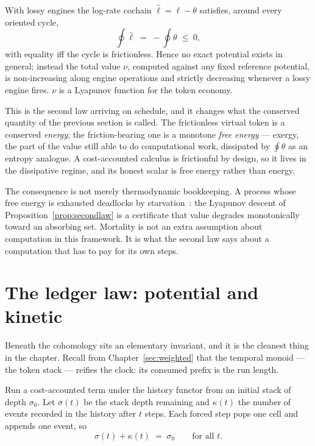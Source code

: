 \begin{proposition}
\label{prop:secondlaw}
With lossy engines the log-rate cochain $\hat\ell = \ell - \theta$
satisfies, around every oriented cycle,
\[
  \oint \hat\ell \;=\; -\oint \theta \;\leq\; 0,
\]
with equality iff the cycle is frictionless.  Hence no exact potential
exists in general; instead the total value $\nu$, computed against any
fixed reference potential, is non-increasing along engine operations and
strictly decreasing whenever a lossy engine fires.  $\nu$ is a Lyapunov
function for the token economy.
\end{proposition}

\begin{remark}
\label{rmk:exergy}
This is the second law arriving on schedule, and it changes what the
conserved quantity of the previous section is called.  The frictionless
virtual token is a conserved \emph{energy}; the friction-bearing one is a
monotone \emph{free energy} --- exergy, the part of the value still able
to do computational work, dissipated by $\oint\theta$ as an entropy
analogue.  A cost-accounted calculus is frictionful by design, so it lives
in the dissipative regime, and its honest scalar is free energy rather
than energy.

The consequence is not merely thermodynamic bookkeeping.  A process whose
free energy is exhausted deadlocks by starvation~\cite{MC}: the Lyapunov
descent of Proposition~\ref{prop:secondlaw} is a certificate that value
degrades monotonically toward an absorbing set.  Mortality is not an extra
assumption about computation in this framework.  It is what the second law
says about a computation that has to pay for its own steps.
\end{remark}

\section{The ledger law: potential and kinetic}

Beneath the cohomology sits an elementary invariant, and it is the
cleanest thing in the chapter.  Recall from Chapter~\ref{sec:weighted}
that the temporal monoid --- the token stack --- reifies the clock: its
consumed prefix is the run length.

\begin{proposition}
\label{thm:conservation}
Run a cost-accounted term under the history functor from an initial stack
of depth $\sigma_0$.  Let $\sigma(t)$ be the stack depth remaining and
$\kappa(t)$ the number of events recorded in the history after $t$ steps.
Each forced step pops one cell and appends one event, so
\[
  \sigma(t) + \kappa(t) \;=\; \sigma_0 \qquad \text{for all } t.
\]
\end{proposition}


